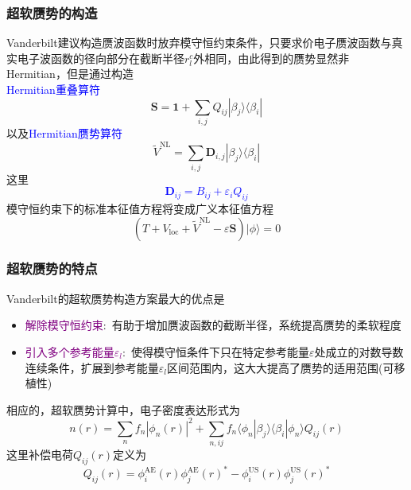 {\frame
{
\frametitle{超软赝势的构造}
\textrm{Vanderbilt}建议构造赝波函数时放弃模守恒约束条件，只要求价电子赝波函数与真实电子波函数的径向部分在截断半径$r_{l}^c$外相同，由此得到的赝势显然非\textrm{Hermitian}，但是通过构造\\\textcolor{blue}{\textrm{Hermitian}重叠算符}
\begin{displaymath}
	\mathbf{S}=\mathbf{1}+\sum_{i,j}Q_{ij}|\beta_j\rangle\langle\beta_i|
\end{displaymath}
以及\textcolor{blue}{\textrm{Hermitian}赝势算符}
\begin{displaymath}
	\tilde V^{\mathrm{NL}}=\sum_{i,j}\mathbf{D}_{i,j}|\beta_j\rangle\langle\beta_i|
\end{displaymath}
这里\textcolor{blue}{
\begin{displaymath}
	\mathbf{D}_{ij}=B_{ij}+\varepsilon_iQ_{ij}
\end{displaymath}}
模守恒约束下的标准本征值方程将变成广义本征值方程
\begin{displaymath}
	(T+V_{\mathrm{loc}}+\tilde V^{\mathrm{NL}}-\varepsilon\mathbf{S})|\phi\rangle=0
\end{displaymath}
}

\frame
{
\frametitle{超软赝势的特点}
\textrm{Vanderbilt}的超软赝势构造方案最大的优点是
\begin{itemize}
	\item \textcolor{purple}{解除模守恒约束}:~有助于增加赝波函数的截断半径，系统提高赝势的柔软程度
	\item \textcolor{purple}{引入多个参考能量$\varepsilon_l$}:~使得模守恒条件下只在特定参考能量$\varepsilon$处成立的对数导数连续条件，扩展到参考能量$\varepsilon_l$区间范围内，这大大提高了赝势的适用范围(可移植性)
\end{itemize}

相应的，超软赝势计算中，电子密度表达形式为
\begin{displaymath}
	n(r)=\sum_nf_n|\phi_n(r)|^2+\sum_{n,ij}f_n\langle\phi_n|\beta_j\rangle\langle\beta_i|\phi_n\rangle Q_{ij}(r)
\end{displaymath}
这里补偿电荷$Q_{ij}(r)$定义为
\begin{displaymath}
	Q_{ij}(r)=\phi_i^{\mathrm{AE}}(r)\phi_j^{\mathrm{AE}}(r)^{\ast}-\phi_i^{\mathrm{US}}(r)\phi_j^{\mathrm{US}}(r)^{\ast}
\end{displaymath}
}

}
